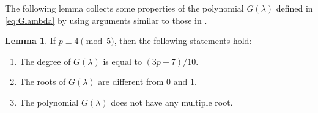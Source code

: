 \documentclass{article}
\theoremstyle{definition}
\newtheorem{Lem}[Def]{Lemma}
\begin{document}
\newpage
The following lemma collects some properties of the polynomial $G(\lambda)$ defined in \eqref{eq:Glambda} by using arguments similar to those in \cite[Section 1.4]{IKO}.\vspace{-1.3mm}
\begin{Lem}\label{lem:simple_for_type6}
If $p \equiv 4 \pmod{5}$, then the following statements hold:\vspace{-1.1mm}
\begin{enumerate}
\item[(1)] The degree of $G(\lambda)$ is equal to $(3p-7)/10$.\vspace{-2.6mm}
\item[(2)] The roots of $G(\lambda)$ are different from $0$ and $1$.\vspace{-2.6mm}
\item[(3)] The polynomial $G(\lambda)$ does not have any multiple root.\vspace{-0.3mm}
\end{enumerate}
\end{Lem}
\end{document}
